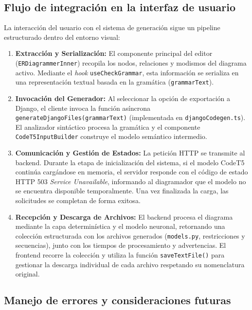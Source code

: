 \subsection{Flujo de integración en la interfaz de usuario}
\label{subsec:p3-flujo-ui}

La interacción del usuario con el sistema de generación sigue un pipeline estructurado dentro del entorno visual:

\begin{enumerate}
    \item \textbf{Extracción y Serialización:} El componente principal del editor (\texttt{ERDiagrammerInner}) recopila los nodos, relaciones y modismos del diagrama activo. Mediante el \textit{hook} \texttt{useCheckGrammar}, esta información se serializa en una representación textual basada en la gramática (\texttt{grammarText}).
    \item \textbf{Invocación del Generador:} Al seleccionar la opción de exportación a Django, el cliente invoca la función asíncrona \texttt{generateDjangoFiles(grammarText)} (implementada en \texttt{djangoCodegen.ts}). El analizador sintáctico procesa la gramática y el componente \texttt{CodeT5InputBuilder} construye el modelo semántico intermedio.
    \item \textbf{Comunicación y Gestión de Estados:} La petición HTTP se transmite al backend. Durante la etapa de inicialización del sistema, si el modelo CodeT5 continúa cargándose en memoria, el servidor responde con el código de estado HTTP 503 \textit{Service Unavailable}, informando al diagramador que el modelo no se encuentra disponible temporalmente. Una vez finalizada la carga, las solicitudes se completan de forma exitosa.
    \item \textbf{Recepción y Descarga de Archivos:} El backend procesa el diagrama mediante la capa determinística y el modelo neuronal, retornando una colección estructurada con los archivos generados (\texttt{models.py}, restricciones y secuencias), junto con los tiempos de procesamiento y advertencias. El frontend recorre la colección y utiliza la función \texttt{saveTextFile()} para gestionar la descarga individual de cada archivo respetando su nomenclatura original.
\end{enumerate}

\subsection{Manejo de errores y consideraciones futuras}
\label{subsec:p3-manejo-errores}

